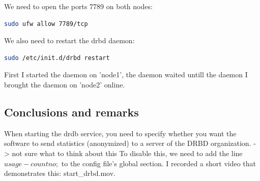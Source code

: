 \documentclass[12pt]{report}
\begin{document}
We need to open the ports 7789 on both nodes:
\begin{lstlisting}[language=bash]
sudo ufw allow 7789/tcp
\end{lstlisting}

We also need to restart the drbd daemon: 
\begin{lstlisting}[language=bash]
sudo /etc/init.d/drbd restart
\end{lstlisting}

First I started the daemon on 'node1', the daemon waited untill the
daemon I brought the daemon on 'node2' online.

\subsection{Conclusions and remarks}
When starting the drdb service, you need to specify
whether you want the software to send statistics (anonymized) to a
server of the DRBD organization. -> not sure what to think about this
To disable this, we need to add the line $usage-count no;$ to the config file's
global section.
I recorded a short video that demonstrates this: start\_drbd.mov.
\end{document}
